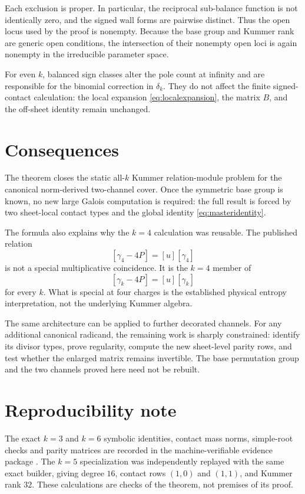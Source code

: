 \documentclass[11pt,a4paper]{article}
\theoremstyle{definition}
\theoremstyle{remark}
\begin{document}
Each exclusion is proper.  In particular, the reciprocal sub-balance
function is not identically zero, and the signed wall forms are pairwise
distinct.  Thus the open locus used by the proof is nonempty.  Because the
base group and Kummer rank are generic open conditions, the intersection of
their nonempty open loci is again nonempty in the irreducible parameter
space.

For even $k$, balanced sign classes alter the pole count at infinity and are
responsible for the binomial correction in $\delta_k$.  They do not affect the
finite signed-contact calculation: the local expansion
\eqref{eq:localexpansion}, the matrix $B$, and the off-sheet identity remain
unchanged.

\section{Consequences}

The theorem closes the static all-$k$ Kummer relation-module problem for the
canonical norm-derived two-channel cover.  Once the symmetric base group is
known, no new large Galois computation is required: the full result is forced
by two sheet-local contact types and the global identity
\eqref{eq:masteridentity}.

The formula also explains why the $k=4$ calculation was reusable.  The
published relation
\[
 [\gamma_4-4P]=[u][\gamma_4]
\]
is not a special multiplicative coincidence.  It is the $k=4$ member of
\[
 [\gamma_k-4P]=[u][\gamma_k]
\]
for every $k$.  What is special at four charges is the established physical
entropy interpretation, not the underlying Kummer algebra.

The same architecture can be applied to further decorated channels.  For any
additional canonical radicand, the remaining work is sharply constrained:
identify its divisor types, prove regularity, compute the new sheet-level
parity rows, and test whether the enlarged matrix remains invertible.  The
base permutation group and the two channels proved here need not be rebuilt.

\section*{Reproducibility note}

The exact $k=3$ and $k=6$ symbolic identities, contact mass norms, simple-root
checks and parity matrices are recorded in the machine-verifiable evidence
package \cite{KillTest}.  The $k=5$ specialization was independently replayed
with the same exact builder, giving degree $16$, contact rows $(1,0)$ and
$(1,1)$, and Kummer rank $32$.  These calculations are checks of the theorem,
not premises of its proof.
\end{document}

